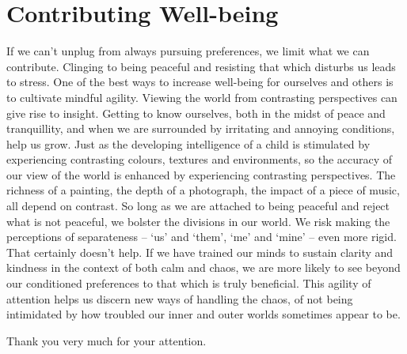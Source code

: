 \section{Contributing Well-being}

If we can’t unplug from always pursuing preferences, we limit what we
can contribute. Clinging to being peaceful and resisting that which
disturbs us leads to stress. One of the best ways to increase well-being
for ourselves and others is to cultivate mindful agility. Viewing the
world from contrasting perspectives can give rise to insight. Getting to
know ourselves, both in the midst of peace and tranquillity, and when we
are surrounded by irritating and annoying conditions, help us grow. Just
as the developing intelligence of a child is stimulated by experiencing
contrasting colours, textures and environments, so the accuracy of our
view of the world is enhanced by experiencing contrasting perspectives.
The richness of a painting, the depth of a photograph, the impact of a
piece of music, all depend on contrast. So long as we are attached to
being peaceful and reject what is not peaceful, we bolster the divisions
in our world. We risk making the perceptions of separateness – ‘us’ and
‘them’, ‘me’ and ‘mine’ – even more rigid. That certainly doesn’t help.
If we have trained our minds to sustain clarity and kindness in the
context of both calm and chaos, we are more likely to see beyond our
conditioned preferences to that which is truly beneficial. This agility
of attention helps us discern new ways of handling the chaos, of not
being intimidated by how troubled our inner and outer worlds sometimes
appear to be.

Thank you very much for your attention.
